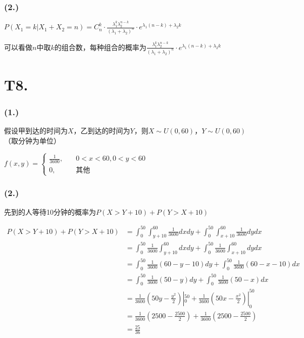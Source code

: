 \documentclass{article}
\newcommand\f[2]{\frac{#1}{#2}}
\begin{document}
\subsubsection*{(2.)}

$P(X_1=k|X_1+X_2=n)=C_n^k\cdot\f{\lambda_1^k\lambda_2^{n-k}}{(\lambda_1+\lambda_2)^n}\cdot e^{\lambda_1(n-k)+\lambda_2k}$

可以看做$n$中取$k$的组合数，每种组合的概率为$\f{\lambda_1^k\lambda_2^{n-k}}{(\lambda_1+\lambda_2)^n}\cdot e^{\lambda_1(n-k)+\lambda_2k}$

\section*{T8. }

\subsubsection*{(1.)}

假设甲到达的时间为$X$，乙到达的时间为$Y$，则$X\sim U(0,60)$，$Y\sim U(0,60)$（取分钟为单位）

$f(x,y)=
\begin{cases}
    \f{1}{3600}, &\quad 0<x<60,0<y<60\\
    0, &\quad \text{其他}
\end{cases}
$

\subsubsection*{(2.)}

先到的人等待10分钟的概率为$P(X>Y+10)+P(Y>X+10)$

\begin{equation}
    \begin{aligned}
        P(X>Y+10)+P(Y>X+10)
        & = \int_{0}^{50}\int_{y+10}^{60}\f{1}{3600}dxdy+\int_{0}^{50}\int_{x+10}^{60}\f{1}{3600}dydx\\
        & = \int_{0}^{50}\f{1}{3600}\int_{y+10}^{60}dxdy+\int_{0}^{50}\f{1}{3600}\int_{x+10}^{60}dydx\\
        & = \int_{0}^{50}\f{1}{3600}(60-y-10)dy+\int_{0}^{50}\f{1}{3600}(60-x-10)dx\\
        & = \int_{0}^{50}\f{1}{3600}(50-y)dy+\int_{0}^{50}\f{1}{3600}(50-x)dx\\
        & = \f{1}{3600}(50y-\f{y^2}{2})|_0^{50}+\f{1}{3600}(50x-\f{x^2}{2})|_0^{50}\\
        & = \f{1}{3600}(2500-\f{2500}{2})+\f{1}{3600}(2500-\f{2500}{2})\\
        & = \f{25}{36}\\
    \end{aligned}
\end{equation}
\end{document}
